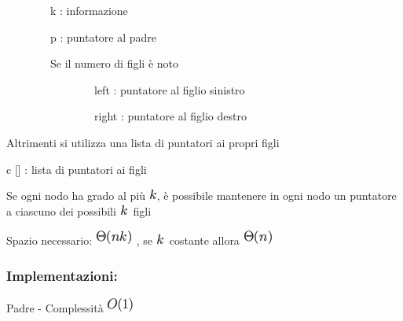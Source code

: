 \documentclass{article}
\begin{document}
{~~~~~~~~k : informazione}

{~~~~~~~~p : puntatore al padre}



{~~~~~~~~Se il numero di figli è noto}

{}

{~~~~~~~~~~~~~~~~left : puntatore al figlio sinistro}

{~~~~~~~~~~~~~~~~right : puntatore al figlio destro}

{}

{Altrimenti si utilizza una lista di puntatori ai propri figli}

{}

{c {[}{]} : lista di puntatori ai figli~~~~~~~~}

{}

{Se ogni nodo ha grado al più }\includegraphics{images/image118.png}{, è
possibile mantenere in ogni nodo un puntatore a ciascuno dei possibili
}\includegraphics{images/image118.png}{~figli}

{}

{Spazio necessario: }\includegraphics{images/image119.png}{~, se
}\includegraphics{images/image118.png}{~costante allora
}\includegraphics{images/image120.png}

{}

\hypertarget{h.7iunf1nu58vy}{\subsubsection{\texorpdfstring{{Implementazioni:}}{Implementazioni:}}\label{h.7iunf1nu58vy}}

{Padre - }{Complessità }\includegraphics{images/image121.png}

\protect\hypertarget{t.1fda366af82bd8d3dda4418d0091c3a44b3de824}{}{}\protect\hypertarget{t.9}{}{}
\end{document}
